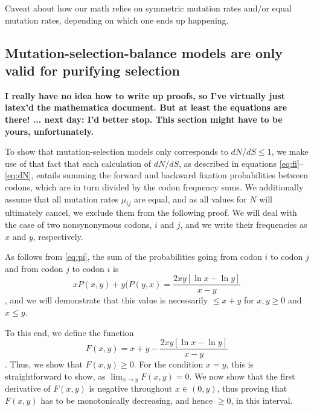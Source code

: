 \documentclass[11pt]{article}
\begin{document}
Caveat about how our math relies on symmetric mutation rates and/or equal mutation rates, depending on which one ends up happening.
	

\subsection*{Mutation-selection-balance models are only valid for purifying selection}

\textbf{I really have no idea how to write up proofs, so I've virtually just latex'd the mathematica document. But at least the equations are there! ... next day: I'd better stop. This section might have to be yours, unfortunately.}

To show that mutation-selection models only corresponds to $dN/dS \leq 1$, we make use of that fact that each calculation of $dN/dS$, as described in equations \eqref{eq:fi}--\eqref{eq:dN}, entails summing the forward and backward fixation probabilities between codons, which are in turn divided by the codon frequency sums. We additionally assume that all mutation rates $\mu_{ij}$ are equal, and as all values for $N$ will ultimately cancel, we exclude them from the following proof. We will deal with the case of two nonsynonymous codons, $i$ and $j$, and we write their frequencies as $x$ and $y$, respectively.

As follows from \eqref{eq:pi}, the sum of the probabilities going from codon $i$ to codon $j$ and from codon $j$ to codon $i$ is \begin{equation} xP(x,y) + y(P(y,x) = \frac{2xy [\ln x - \ln y]}{x - y}\end{equation}, and we will demonstrate that this value is necessarily $\leq x + y$ for $x,y \geq 0$ and $x \leq y$.

To this end, we define the function \begin{equation} F(x,y) = x + y - \frac{2xy [\ln x - \ln y]}{x - y} \end{equation}. Thus, we show that $F(x,y) \geq 0$. For the condition $x=y$, this is straightforward to show, as $\lim_{x \to y}F(x,y) = 0$.
We now show that the first derivative of $F(x, y)$ is negative throughout $x \in (0,y)$, thus proving that $F(x, y)$ has to be monotonically decreasing, and hence $\geq0$, in this interval.
\end{document}
